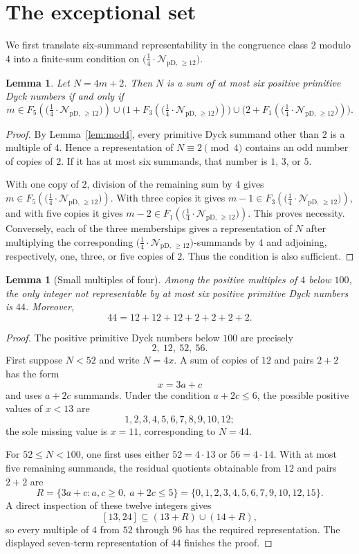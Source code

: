 \documentclass[12pt]{article}
\theoremstyle{plain}
\newtheorem{lemma}[theorem]{Lemma}
\newcommand{\Pset}{\bigl(\tfrac14\cdot
  \mathcal N_{\mathrm{pD,\,\geq12}}\bigr)}
\begin{document}
\section{The exceptional set}\label{sec:exceptions}

We first translate six-summand representability in the congruence class
$2$ modulo $4$ into a finite-sum condition on $\Pset$.

\begin{lemma}\label{lem:sixcriterion}
Let $N=4m+2$.  Then $N$ is a sum of at most six positive primitive Dyck
numbers if and only if
\[
 m\in F_5(\Pset)
 \cup\bigl(1+F_3(\Pset)\bigr)
 \cup\bigl(2+F_1(\Pset)\bigr).
\]
\end{lemma}

\begin{proof}
By Lemma~\ref{lem:mod4}, every primitive Dyck summand other than $2$ is
a multiple of $4$.  Hence a representation of $N\equiv2\pmod 4$ contains
an odd number of copies of $2$.  If it has at most six summands, that
number is $1$, $3$, or $5$.

With one copy of $2$, division of the remaining sum by $4$ gives
$m\in F_5(\Pset)$.  With three copies it gives
$m-1\in F_3(\Pset)$, and with five copies it gives
$m-2\in F_1(\Pset)$.  This proves necessity.  Conversely, each of the
three memberships gives a representation of $N$ after multiplying the
corresponding $\Pset$-summands by $4$ and adjoining, respectively, one,
three, or five copies of $2$.  Thus the condition is also sufficient.
\end{proof}

\begin{lemma}[Small multiples of four]\label{lem:smallmultiples}
Among the positive multiples of $4$ below $100$, the only integer not
representable by at most six positive primitive Dyck numbers is $44$.
Moreover,
\[
 44=12+12+12+2+2+2+2.
\]
\end{lemma}

\begin{proof}
The positive primitive Dyck numbers below $100$ are precisely
\[
 2,\ 12,\ 52,\ 56.
\]
First suppose $N<52$ and write $N=4x$.  A sum of copies of $12$ and
pairs $2+2$ has the form
\[
 x=3a+c
\]
and uses $a+2c$ summands.  Under the condition $a+2c\leq6$, the possible
positive values of $x<13$ are
\[
 1,2,3,4,5,6,7,8,9,10,12;
\]
the sole missing value is $x=11$, corresponding to $N=44$.

For $52\leq N<100$, one first uses either $52=4\cdot13$ or
$56=4\cdot14$.  With at most five remaining summands, the residual
quotients obtainable from $12$ and pairs $2+2$ are
\[
 R=\{3a+c:a,c\geq0,\ a+2c\leq5\}
   =\{0,1,2,3,4,5,6,7,9,10,12,15\}.
\]
A direct inspection of these twelve integers gives
\[
 [13,24]\subseteq(13+R)\cup(14+R),
\]
so every multiple of $4$ from $52$ through $96$ has the required
representation.  The displayed seven-term representation of $44$
finishes the proof.
\end{proof}
\end{document}
